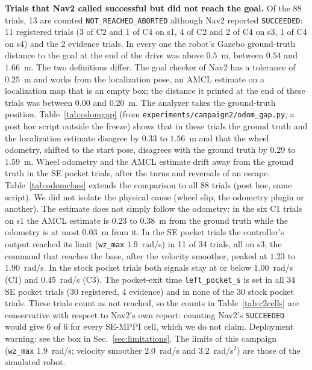 \documentclass[journal]{IEEEtran}
\begin{document}
\textbf{Trials that Nav2 called successful but did not reach the goal.} Of the 88 trials, 13 are
counted \texttt{NOT\_REACHED\_ABORTED} although Nav2 reported \texttt{SUCCEEDED}: 11 registered trials
(3 of C2 and 1 of C4 on s1, 4 of C2 and 2 of C4 on s3, 1 of C4 on s4) and the 2 evidence trials. In
every one the robot's Gazebo ground-truth distance to the goal at the end of the drive was above $0.5$~m,
between $0.54$ and $1.66$~m. The two definitions differ. The goal checker of Nav2 has a tolerance of
$0.25$~m and works from the localization pose, an AMCL estimate on a localization map that is an empty
box; the distance it printed at the end of these trials was between $0.00$ and $0.20$~m. The analyzer takes the ground-truth
position. Table~\ref{tab:odomgap} (from \texttt{experiments/campaign2/odom\_gap.py}, a post hoc script
outside the freeze) shows that in these trials the ground truth and the localization estimate disagree
by $0.33$ to $1.56$~m and that the wheel odometry, shifted to the start pose, disagrees with the ground truth by $0.29$ to
$1.59$~m. Wheel odometry and the AMCL estimate drift away from the ground truth in the SE pocket trials,
after the turns and reversals of an escape. Table~\ref{tab:odomclass} extends the comparison to
all 88 trials (post hoc, same script). We did not isolate the physical cause (wheel slip, the
odometry plugin or another). The estimate does not simply follow the odometry: in the six C1
trials on s1 the AMCL estimate is $0.23$ to $0.38$~m from the ground truth while the odometry is
at most $0.03$~m from it. In the SE pocket trials the controller's output reached its limit
(\texttt{wz\_max} $1.9$~rad/s) in 11 of 34 trials, all on s3; the command that reaches the base,
after the velocity smoother, peaked at $1.23$ to $1.90$~rad/s. In the stock pocket trials both
signals stay at or below $1.00$~rad/s (C1) and $0.45$~rad/s (C3). The pocket-exit time
\texttt{left\_pocket\_s} is set in all 34 SE pocket trials (30 registered, 4 evidence) and in
none of the 30 stock pocket trials.
These trials count as not reached, so the counts in Table~\ref{tab:c2cells} are conservative with respect to
Nav2's own report: counting Nav2's \texttt{SUCCEEDED} would give 6 of 6 for every SE-MPPI cell, which we do not claim. Deployment warning: see the box in Sec.~\ref{sec:limitations}. The limits of this campaign (\texttt{wz\_max}
$1.9$~rad/s; velocity smoother $2.0$~rad/s and $3.2$~rad/s$^2$) are those of the simulated robot.
\end{document}
